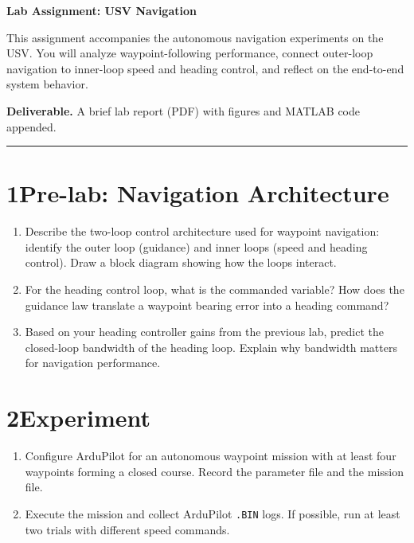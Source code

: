 \documentclass[11pt]{article}
\begin{document}
\begin{center}
  \Large{\bf{Lab Assignment: USV Navigation}}
\end{center}

This assignment accompanies the autonomous navigation experiments on the USV.
You will analyze waypoint-following performance, connect outer-loop navigation
to inner-loop speed and heading control, and reflect on the end-to-end
system behavior.

\textbf{Deliverable.}  A brief lab report (PDF) with figures and MATLAB code
appended.

\bigskip\hrule\bigskip

\section*{1\quad Pre-lab: Navigation Architecture}

\begin{enumerate}

\item Describe the two-loop control architecture used for waypoint navigation:
  identify the outer loop (guidance) and inner loops (speed and heading
  control).  Draw a block diagram showing how the loops interact.

\item For the heading control loop, what is the commanded variable?  How does
  the guidance law translate a waypoint bearing error into a heading command?

\item Based on your heading controller gains from the previous lab, predict
  the closed-loop bandwidth of the heading loop.  Explain why bandwidth
  matters for navigation performance.

\end{enumerate}

\section*{2\quad Experiment}

\begin{enumerate}[resume]

\item Configure ArduPilot for an autonomous waypoint mission with at least four
  waypoints forming a closed course.  Record the parameter file and the mission
  file.

\item Execute the mission and collect ArduPilot \texttt{.BIN} logs.
  If possible, run at least two trials with different speed commands.

\end{enumerate}
\end{document}
